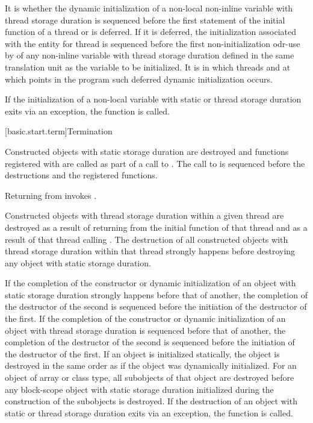 \pnum
It is 
whether the dynamic initialization of a
non-local non-inline variable with thread storage duration
is sequenced before the first statement of the initial function of a thread or is deferred.
If it is deferred,
the initialization associated with the entity for thread 
is sequenced before the first non-initialization odr-use by 
of any non-inline variable with thread storage duration
defined in the same translation unit as the variable to be initialized.
It is 
in which threads and at which points in the program such deferred dynamic initialization occurs.

\pnum
If the initialization of
a non-local variable with static or thread storage duration
exits via an exception,
the function  is called.%

[basic.start.term]{Termination}

\pnum
{}%
%
%
Constructed objects
with static storage duration are destroyed
and functions registered with 
are called as part of a call to
%
%
.
The call to  is sequenced before
the destructions and the registered functions.
\begin{note}
Returning from  invokes .
\end{note}

\pnum
Constructed objects with thread storage duration within a given thread
are destroyed as a result of returning from the initial function of that thread and as a
result of that thread calling .
The destruction of all constructed objects with thread storage
duration within that thread strongly happens before destroying
any object with static storage duration.

\pnum
If the completion of the constructor or dynamic initialization of an object with static
storage duration strongly happens before that of another, the completion of the destructor
of the second is sequenced before the initiation of the destructor of the first.
If the completion of the constructor or dynamic initialization of an object with thread
storage duration is sequenced before that of another, the completion of the destructor
of the second is sequenced before the initiation of the destructor of the first.
If an object is
initialized statically, the object is destroyed in the same order as if
the object was dynamically initialized. For an object of array or class
type, all subobjects of that object are destroyed before any block-scope
object with static storage duration initialized during the construction
of the subobjects is destroyed.
If the destruction of an object with static or thread storage duration
exits via an exception,
the function  is called.

